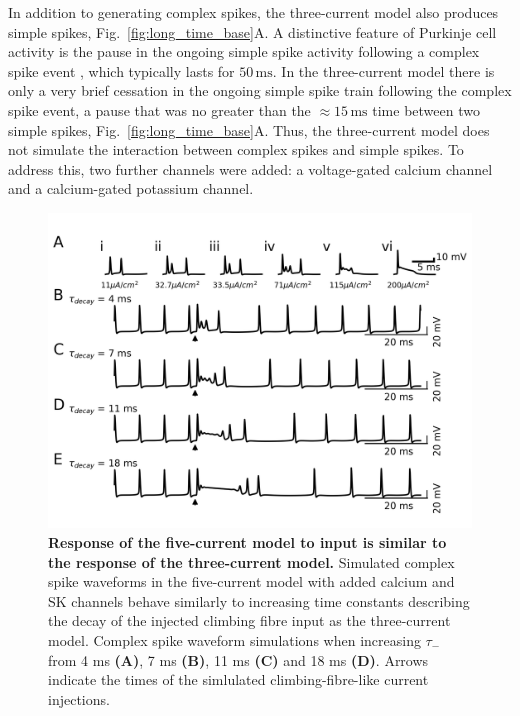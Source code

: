 \documentclass[twocolumn]{svjour3}          %
\newcommand{\mse}{\,\mathrm{ms}}
\begin{document}
In addition to generating complex spikes, the three-current model also
produces simple spikes, Fig.~\ref{fig:long_time_base}A. A distinctive
feature of Purkinje cell activity is the pause in the ongoing simple
spike activity following a complex spike event \citep{BellGrimm1969,GranitPhillips1956,Thach1967}, which typically lasts for
$50\mse$. In the three-current model there is only a very brief
cessation in the ongoing simple spike train following the complex
spike event, a pause that was no greater than the $\approx 15\mse$
time between two simple spikes, Fig.~\ref{fig:long_time_base}A. Thus,
the three-current model does not simulate the interaction
between complex spikes and simple spikes. To address this, two further
channels were added: a voltage-gated calcium channel and a
calcium-gated potassium channel.



\begin{figure}[!ht]
  \includegraphics[width=\linewidth]{Figure6.png}
\caption{\textbf{Response of the five-current model to input is similar
    to the response of the three-current model.} Simulated complex
  spike waveforms in the five-current model with added calcium and SK
  channels behave similarly to increasing time constants describing the decay of the
  injected climbing fibre input as the three-current model. Complex spike waveform simulations when increasing $\tau_-$ from 4 ms
  \textbf{(A)}, 7 ms \textbf{(B)}, 11 ms \textbf{(C)} and 18 ms
  \textbf{(D)}. Arrows indicate the times
  of the simlulated climbing-fibre-like current injections.}
\label{S2_Fig}
\end{figure}
\end{document}
